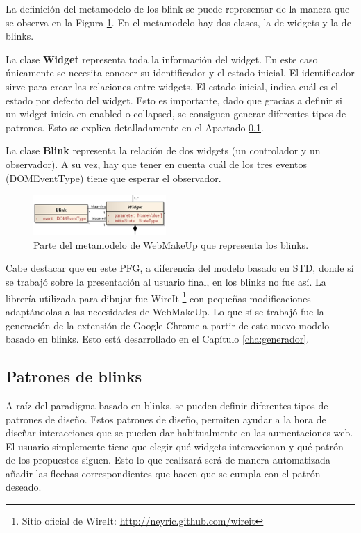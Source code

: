 La definición del metamodelo de los blink se puede representar de la manera que se observa en la Figura \ref{fig:BlinkMetamodel}. En el metamodelo hay dos clases, la de widgets y la de blinks. 

La clase \textbf{Widget} representa toda la información del widget. En este caso únicamente se necesita conocer su identificador y el estado inicial. El identificador sirve para crear las relaciones entre widgets. El estado inicial, indica cuál es el estado por defecto del widget. Esto es importante, dado que gracias a definir si un widget inicia en enabled o collapsed, se consiguen generar diferentes tipos de patrones. Esto se explica detalladamente en el Apartado \ref{sec:PatronesBlinks}.

La clase \textbf{Blink} representa la relación de dos widgets (un controlador y un observador). A su vez, hay que tener en cuenta cuál de los tres eventos (DOMEventType) tiene que esperar el observador.

\begin{figure}
\begin{center}
\includegraphics[width=0.45\textwidth]{figs/4-BlinkMetamodel.png}
\caption{Parte del metamodelo de WebMakeUp que representa los blinks.}
\label{fig:BlinkMetamodel}
\end{center}
\end{figure}

Cabe destacar que en este PFG, a diferencia del modelo basado en STD, donde sí se trabajó sobre la presentación al usuario final, en los blinks no fue así. La librería utilizada para dibujar fue WireIt \footnote{Sitio oficial de WireIt: \url{http://neyric.github.com/wireit}} con pequeñas modificaciones adaptándolas a las necesidades de WebMakeUp. Lo que sí se trabajó fue la generación de la extensión de Google Chrome a partir de este nuevo modelo basado en blinks. Esto está desarrollado en el Capítulo \ref{cha:generador}.

\subsection{Patrones de blinks}
\label{sec:PatronesBlinks}

A raíz del paradigma basado en blinks, se pueden definir diferentes tipos de patrones de diseño. Estos patrones de diseño, permiten ayudar a la hora de diseñar interacciones que se pueden dar habitualmente en las aumentaciones web. El usuario simplemente tiene que elegir qué widgets interaccionan y qué patrón de los propuestos siguen. Esto lo que realizará será de manera automatizada añadir las flechas correspondientes que hacen que se cumpla con el patrón deseado. 

